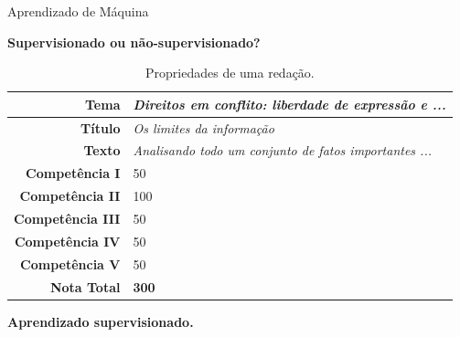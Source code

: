 \documentclass[10pt]{beamer}
\begin{document}
  \begin{frame}[fragile]{Aprendizado de Máquina}
    \begin{center}
    \textbf{Supervisionado ou não-supervisionado?}
    \end{center}
    \begin{table}[]
    \centering
    \begin{tabular}{|r|l|}
    \hline
    \textbf{Tema} & \textit{Direitos em conflito: liberdade de expressão e ...} \\ \hline
    \textbf{Título} & \textit{Os limites da informação} \\ \hline
    \textbf{Texto} & \textit{Analisando todo um conjunto de fatos importantes ...} \\ \hline
    \textbf{Competência I} & 50 \\ \hline
    \textbf{Competência II} & 100 \\ \hline
    \textbf{Competência III} & 50 \\ \hline
    \textbf{Competência IV} & 50 \\ \hline
    \textbf{Competência V} & 50 \\ \hline
    \textbf{Nota Total} & \textbf{300} \\ \hline
    \end{tabular}
    \caption{Propriedades de uma redação.}
    \end{table}
    \begin{center}
      \textbf{Aprendizado supervisionado.}
    \end{center}
  \end{frame}
\end{document}
